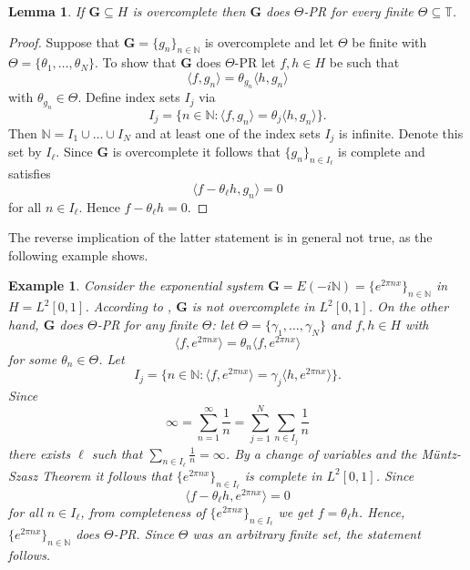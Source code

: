 \documentclass[reqno,a4paper,11pt]{amsart}
\numberwithin{equation}{section}
\newtheorem{lemma}[definition]{Lemma}
\newtheorem{example}[definition]{Example}
\def\N{{\mathbb N}}
\def\T{{\mathbb T}}
\newcommand\1{\mathds{1}}
\begin{document}
\begin{lemma}\label{prop:overcompleteness}
    If $\mathbf{G} \subseteq H$ is overcomplete then $\mathbf{G}$ does $\Theta$-PR for every finite $\Theta\subseteq \T$.
\end{lemma}
\begin{proof}
    Suppose that $\mathbf{G} = \{ g_n \}_{n \in \N}$ is overcomplete and let $\Theta$ be finite with $\Theta = \{ \theta_1, \dots, \theta_N \}$. To show that $\mathbf{G}$ does $\Theta$-PR let $f,h \in H$ be such that
    $$
    \langle f,g_n \rangle = \theta_{g_n} \langle h,g_n \rangle
    $$
    with $\theta_{g_n} \in \Theta$. Define index sets $I_j$ via
    $$
    I_j = \{ n \in \N : \langle f,g_n \rangle = \theta_j \langle h,g_n \rangle \}.
    $$
    Then $\N = I_1 \cup \dots \cup I_N$ and at least one of the index sets $I_j$ is infinite. Denote this set by $I_\ell$. Since $\mathbf{G}$ is overcomplete it follows that $\{ g_n \}_{n \in I_\ell}$ is complete and satisfies
    $$
    \langle f-\theta_\ell h, g_n \rangle =0
    $$
    for all $n \in I_\ell$. Hence $f-\theta_\ell h = 0$.
\end{proof}

The reverse implication of the latter statement is in general not true, as the following example shows.

\begin{example}
    Consider the exponential system $\mathbf{G} = E(-i\N) = \{ e^{2\pi n x}\}_{n \in \N}$ in $H=L^2[0,1]$.  According to \cite{chalendar2006overcompleteness}, $\mathbf{G}$ is not overcomplete in $L^2[0,1]$. On the other hand, $\mathbf{G}$ does $\Theta$-PR for any finite $\Theta$: let $\Theta = \{ \gamma_1, \dots, \gamma_N \}$ and $f,h \in H$ with
    $$
    \langle f,e^{2\pi nx} \rangle = \theta_n \langle f,e^{2\pi nx} \rangle
    $$
    for some $\theta_n \in \Theta$. Let
    $$
    I_j = \{ n \in \N : \langle f,e^{2\pi n x } \rangle = \gamma_j \langle h, e^{2\pi n x } \rangle \}.
    $$
    Since
    $$
    \infty = \sum_{n=1}^\infty \frac{1}{n} = \sum_{j=1}^N \sum_{n \in I_j} \frac{1}{n}
    $$
    there exists $\ell$ such that $\sum_{n \in I_\ell} \frac{1}{n} = \infty$. By a change of variables and the Müntz-Szasz Theorem \cite{Young} it follows that $\{ e^{2\pi n x}\}_{n \in I_\ell}$ is complete in $L^2[0,1]$. Since
    $$
    \langle f-\theta_\ell h, e^{2\pi n x} \rangle =0
    $$
    for all $n \in I_\ell$, from completeness of $\{e^{2\pi nx}\}_{n\in I_\ell}$ we get $f=\theta_\ell h$. Hence, $\{ e^{2\pi n x}\}_{n \in \N}$ does $\Theta$-PR. Since $\Theta$ was an arbitrary finite set, the statement follows.
\end{example}
\end{document}
